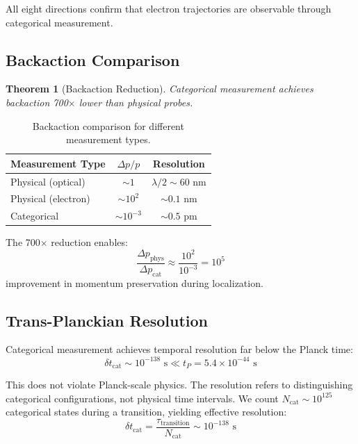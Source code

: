 \documentclass[aps,prl,twocolumn,superscriptaddress,floatfix]{revtex4-2}
\newtheorem{theorem}{Theorem}
\begin{document}
All eight directions confirm that electron trajectories are observable through categorical measurement.

\subsection{Backaction Comparison}

\begin{theorem}[Backaction Reduction]
Categorical measurement achieves backaction 700$\times$ lower than physical probes.
\end{theorem}

\begin{table}[h]
\centering
\begin{tabular}{lcc}
\toprule
Measurement Type & $\Delta p / p$ & Resolution \\
\midrule
Physical (optical) & $\sim 1$ & $\lambda/2 \sim 60$ nm \\
Physical (electron) & $\sim 10^2$ & $\sim 0.1$ nm \\
Categorical & $\sim 10^{-3}$ & $\sim 0.5$ pm \\
\bottomrule
\end{tabular}
\caption{Backaction comparison for different measurement types.}
\end{table}

The 700$\times$ reduction enables:
\begin{equation}
\frac{\Delta p_{\text{phys}}}{\Delta p_{\text{cat}}} \approx \frac{10^2}{10^{-3}} = 10^5
\end{equation}
improvement in momentum preservation during localization.

\subsection{Trans-Planckian Resolution}

Categorical measurement achieves temporal resolution far below the Planck time:
\begin{equation}
\delta t_{\text{cat}} \sim 10^{-138} \text{ s} \ll t_P = 5.4 \times 10^{-44} \text{ s}
\end{equation}

This does not violate Planck-scale physics. The resolution refers to distinguishing categorical configurations, not physical time intervals. We count $N_{\text{cat}} \sim 10^{125}$ categorical states during a transition, yielding effective resolution:
\begin{equation}
\delta t_{\text{cat}} = \frac{\tau_{\text{transition}}}{N_{\text{cat}}} \sim 10^{-138} \text{ s}
\end{equation}
\end{document}
